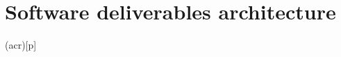 \documentclass[a4paper,twoside,openright,makeidx,12pt]{book}
\begin{document}
\newpage
\chapter{Software deliverables architecture}
\label{Sec:DDD-SoftwareDeliverablesArchitecture}



%


\newpage


\printglosstex(acr)[p]


\cleardoublepage

%

\end{document}

